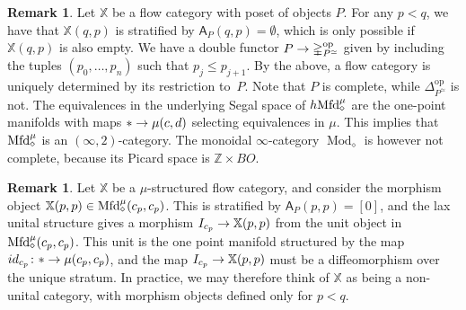 \documentclass[10pt]{amsart}
\numberwithin{equation}{section}
\theoremstyle{definition}
\newtheorem{rem}[prop]{Remark}
\DeclareMathOperator{\Mod}{Mod}
\DeclareMathOperator{\op}{op}
\newcommand{\Mfd}{\mathrm{Mfd}\vphantom{d}}
\newcommand{\bZ}{\mathbb{Z}}
\newcommand{\bX}{\mathbb{X}}
\newcommand{\Simp}{\mathbb{\Delta}}
\newcommand{\sfA}{\mathsf{A}}
\renewcommand{\to}{\mathchoice{\longrightarrow}{\rightarrow}{}{}}
\begin{document}
\begin{rem}\label{rem:trivial_spaces_in_flow_cat}
	Let $\bX$ be a flow category with poset of objects $P$.
	For any $p<q$, we have that $\bX(q,p)$ is stratified by $\sfA_{P}(q,p) = \emptyset$, which is only possible if $\bX(q,p)$ is also empty.
	We have a double functor $P\to \Simp^{\op}_{P^{\simeq}}$ given by including the tuples $(p_{0},\dots, p_{n})$ such that $p_{j}\leq p_{j+1}$.
  By the above, a flow category is uniquely determined by its restriction to~$P$.
  Note that $P$ is complete, while $\Simp^{\op}_{P^{\simeq}}$ is not.
  The equivalences in the underlying Segal space of $h\Mfd^{\mu}_{\diamond}$ are the one-point manifolds with maps $\ast \to \mu(c,d)$ selecting equivalences in $\mu$.
  This implies that $\Mfd^{\mu}_{\diamond}$ is an $(\infty,2)$-category.
  The monoidal $\infty$-category $\Mod_{\diamond}$ is however not complete, because its Picard space is $\bZ\times BO$.
\end{rem}

\begin{rem}\label{rem:units_in_flow_cat}
	Let $\bX$ be a $\mu$-structured flow category, and consider the morphism object $\bX(p,p)\in \Mfd_{\diamond}^{\mu}(c_{p},c_{p})$.
  This is stratified by $\sfA_{P}(p,p) = [0]$, and the lax unital structure gives a morphism $I_{c_{p}} \to \bX(p,p)$ from the unit object in $\Mfd_{\diamond}^{\mu}(c_p,c_{p})$.
  This unit is the one point manifold structured by the map $id_{c_{p}}\colon \ast \to \mu(c_{p},c_{p})$, and the map $I_{c_{p}} \to \bX(p,p)$ must be a diffeomorphism over the unique stratum. In practice, we may therefore think of $\bX$ as being a non-unital category, with morphism objects defined only for $p<q$.
\end{rem}
\end{document}
